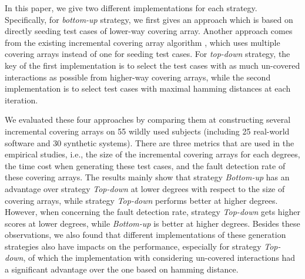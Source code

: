 \documentclass[conference]{IEEEtran}
\theoremstyle{definition}
\begin{document}
In this paper, we give two different implementations for each strategy. Specifically, for \emph{bottom-up} strategy, we first gives an approach which is based on directly seeding test cases of lower-way covering array. Another approach comes from the existing incremental covering array algorithm \cite{fouche2009incremental}, which uses multiple covering arrays instead of one for seeding test cases. For \emph{top-down} strategy, the key of the first implementation is to select the test cases with as much un-covered interactions as possible from higher-way covering arrays, while the second implementation is to select test cases with maximal hamming distances at each iteration.

We evaluated these four approaches by comparing them at constructing several incremental covering arrays on 55 wildly used subjects (including 25 real-world software and 30 synthetic systems). There are three metrics that are used in the empirical studies, i.e., the size of the incremental covering arrays for each degrees, the time cost when generating these test cases, and the fault detection rate of these covering arrays. The results mainly show that strategy \emph{Bottom-up} has an advantage over strategy \emph{Top-down} at lower degrees with respect to the size of covering arrays, while strategy \emph{Top-down} performs better at higher degrees. However, when concerning the fault detection rate, strategy \emph{Top-down} gets higher scores at lower degrees, while \emph{Bottom-up} is better at higher degrees. Besides these observations, we also found that different implementations of these generation strategies also have impacts on the performance, especially for strategy \emph{Top-down}, of which the implementation with considering un-covered interactions had a significant advantage over the one based on hamming distance.


%
\end{document}
